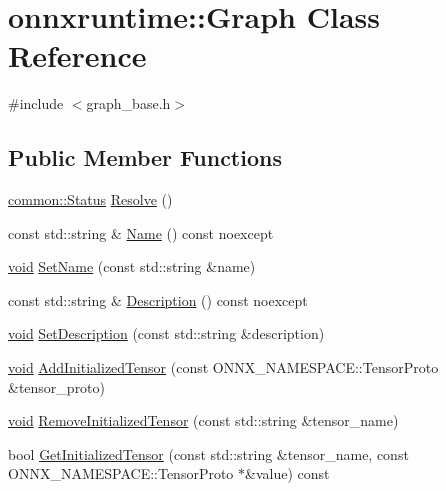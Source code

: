 \hypertarget{classonnxruntime_1_1Graph}{}\section{onnxruntime\+:\+:Graph Class Reference}
\label{classonnxruntime_1_1Graph}


{\ttfamily \#include $<$graph\+\_\+base.\+h$>$}

\subsection*{Public Member Functions}
\begin{DoxyCompactItemize}
\item 
\mbox{\hyperlink{classonnxruntime_1_1common_1_1Status}{common\+::\+Status}} \mbox{\hyperlink{classonnxruntime_1_1Graph_a339e752e0557c49da5e81e9fa8e3cb54}{Resolve}} ()
\item 
const std\+::string \& \mbox{\hyperlink{classonnxruntime_1_1Graph_a94415a0533dea6f376c373a63a2bdc6e}{Name}} () const noexcept
\item 
\mbox{\hyperlink{mlasi_8h_a88f941d423cb2a819b70a1358982b1a6}{void}} \mbox{\hyperlink{classonnxruntime_1_1Graph_aefeff3396d82aee4254a1ed21dc6469a}{Set\+Name}} (const std\+::string \&name)
\item 
const std\+::string \& \mbox{\hyperlink{classonnxruntime_1_1Graph_a3cde3be78cc7acab2626b189af64f82f}{Description}} () const noexcept
\item 
\mbox{\hyperlink{mlasi_8h_a88f941d423cb2a819b70a1358982b1a6}{void}} \mbox{\hyperlink{classonnxruntime_1_1Graph_abf45d42d7f95a9147c7830d9c2cd25ae}{Set\+Description}} (const std\+::string \&description)
\item 
\mbox{\hyperlink{mlasi_8h_a88f941d423cb2a819b70a1358982b1a6}{void}} \mbox{\hyperlink{classonnxruntime_1_1Graph_a5699ed675666c1b351bd35490d94be6d}{Add\+Initialized\+Tensor}} (const O\+N\+N\+X\+\_\+\+N\+A\+M\+E\+S\+P\+A\+C\+E\+::\+Tensor\+Proto \&tensor\+\_\+proto)
\item 
\mbox{\hyperlink{mlasi_8h_a88f941d423cb2a819b70a1358982b1a6}{void}} \mbox{\hyperlink{classonnxruntime_1_1Graph_a061af24d8be21ae2367a458cec6e5fc1}{Remove\+Initialized\+Tensor}} (const std\+::string \&tensor\+\_\+name)
\item 
bool \mbox{\hyperlink{classonnxruntime_1_1Graph_ae0637d52edb20ae9a2700a29eb931e9c}{Get\+Initialized\+Tensor}} (const std\+::string \&tensor\+\_\+name, const O\+N\+N\+X\+\_\+\+N\+A\+M\+E\+S\+P\+A\+C\+E\+::\+Tensor\+Proto $\ast$\&value) const

\end{DoxyCompactItemize}

